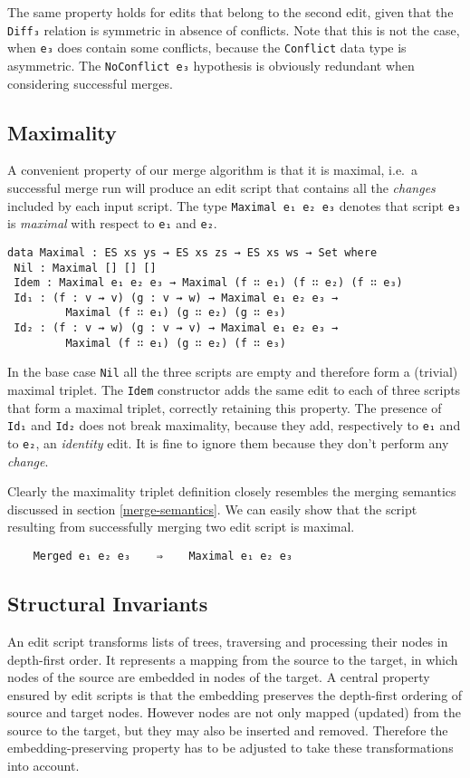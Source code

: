 \documentclass[preprint]{sigplanconf}
\begin{document}
    The same property holds for edits that belong to the second edit, given
    that the \texttt{Diff₃} relation is symmetric in absence of conflicts.	
    Note that this is not the case, when \texttt{e₃} does contain some conflicts,
    because the \texttt{Conflict} data type is asymmetric.
    The \texttt{NoConflict e₃} hypothesis is obviously redundant when
    considering successful merges.
    		
    \subsection{Maximality}
    A convenient property of our merge algorithm is that it is maximal, i.e.\ a successful 
    merge run will produce an edit script that contains all the \emph{changes} included
    by each input script. The type \texttt{Maximal e₁ e₂ e₃} denotes that  
    script \texttt{e₃} is \emph{maximal} with respect to \texttt{e₁} and \texttt{e₂}.
	
\begin{verbatim}
data Maximal : ES xs ys → ES xs zs → ES xs ws → Set where
 Nil : Maximal [] [] []
 Idem : Maximal e₁ e₂ e₃ → Maximal (f ∷ e₁) (f ∷ e₂) (f ∷ e₃)
 Id₁ : (f : v ⇝ v) (g : v ⇝ w) → Maximal e₁ e₂ e₃ → 
         Maximal (f ∷ e₁) (g ∷ e₂) (g ∷ e₃)
 Id₂ : (f : v ⇝ w) (g : v ⇝ v) → Maximal e₁ e₂ e₃ → 
         Maximal (f ∷ e₁) (g ∷ e₂) (f ∷ e₃)
\end{verbatim}

    In the base case \texttt{Nil} all the three scripts
    are empty and therefore form a (trivial) maximal triplet.
    The \texttt{Idem} constructor adds the same edit to each of three scripts 
    that form a maximal triplet, correctly retaining this property.
    The presence of \texttt{Id₁} and \texttt{Id₂} does not break maximality, because
    they add, respectively to \texttt{e₁} and to \texttt{e₂}, an \emph{identity} edit.
    It is fine to ignore them because they don't perform any \emph{change}.

    Clearly the maximality triplet definition closely resembles the merging semantics discussed
    in section \ref{merge-semantics}. We can easily show that the script resulting from
    successfully merging two edit script is maximal.
\begin{verbatim}
    Merged e₁ e₂ e₃    ⇒    Maximal e₁ e₂ e₃
\end{verbatim}

    \subsection{Structural  Invariants}
    An edit script transforms lists of trees, traversing and processing 
    their nodes in depth-first order.
    It represents a mapping from the source to the target, in which 
    nodes of the source are embedded in nodes of the target.
    A central property ensured by edit scripts is that the 
    embedding preserves the depth-first ordering of source and target nodes.
    However nodes are not only mapped (updated) from the source to the 
    target, but they may also be inserted and removed. 
    Therefore the embedding-preserving property has to be adjusted to
    take these transformations into account.
\end{document}
